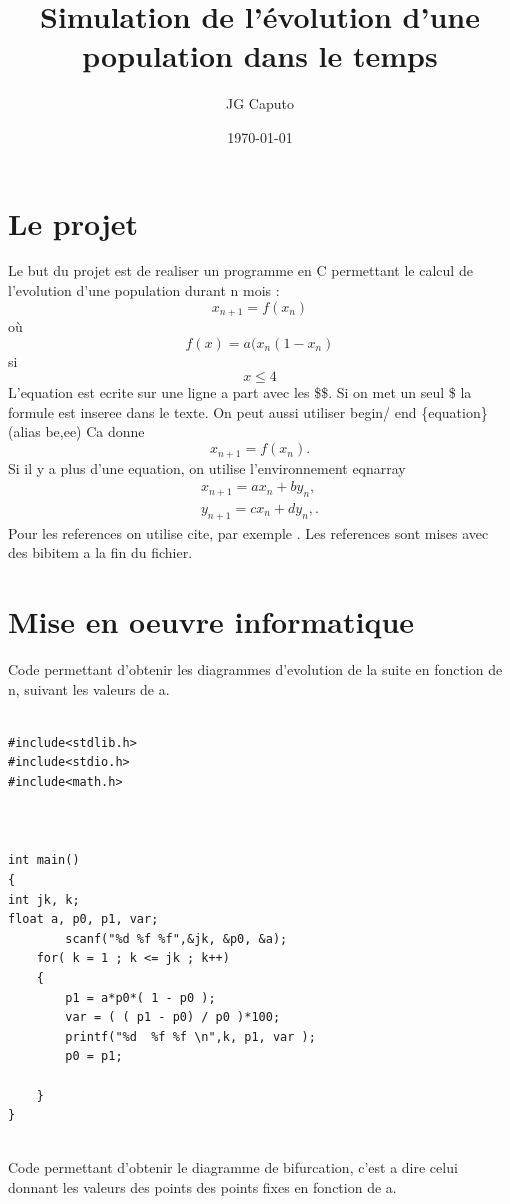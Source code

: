 \documentclass{article}
\begin{document}
\author{ JG Caputo}
\title{Simulation de l'\'evolution d'une population dans le temps}

\date{\today}
\maketitle


\section{Le projet}
Le but du projet est de realiser un programme en C permettant le calcul de l'evolution d'une population durant n mois :
$$x_{n+1}=f(x_n)$$ o\`u $$f(x)=a(x_n( 1 - x_n )$$ si$$x\leq{4}$$
L'equation est ecrite sur une ligne a part avec les \$\$. Si on met un
seul \$ la formule est inseree dans le texte.
On peut aussi utiliser begin/ end \{equation\} (alias be,ee)
Ca donne
\begin{equation}  \label{eq1}
x_{n+1}=f(x_n) . \end{equation}
Si il y a plus d'une equation, on utilise l'environnement eqnarray
\begin{eqnarray}  
x_{n+1}= a x_n + b y_n , \label{eq2}\\
y_{n+1}= c x_n + d y_n , \label{eq3}.
 \end{eqnarray}
Pour les references on utilise cite, par exemple \cite{crs01}. Les references
sont mises avec des bibitem a la fin du fichier.


\section{Mise en oeuvre informatique}

Code permettant d'obtenir les diagrammes d'evolution de la suite en fonction de n, suivant les valeurs de a.

\begin{verbatim}

#include<stdlib.h>
#include<stdio.h>
#include<math.h>



int main()
{
int jk, k;
float a, p0, p1, var;
		scanf("%d %f %f",&jk, &p0, &a);
	for( k = 1 ; k <= jk ; k++)
	{
		p1 = a*p0*( 1 - p0 );
		var = ( ( p1 - p0) / p0 )*100;
		printf("%d  %f %f \n",k, p1, var );
		p0 = p1;

	}
}


\end{verbatim}


Code permettant d'obtenir le diagramme de bifurcation, c'est a dire celui donnant les valeurs des points des points fixes en fonction de a.
\end{document}
